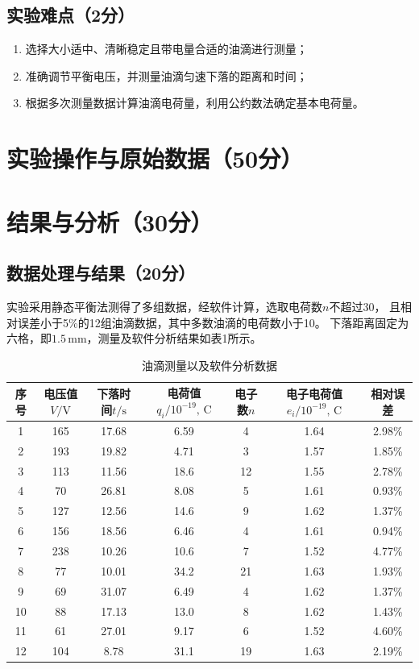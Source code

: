 \documentclass[10pt,a4paper]{ctexart} %
\begin{document}
  \subsection{实验难点（2分）}
  \begin{enumerate}
    \item 选择大小适中、清晰稳定且带电量合适的油滴进行测量；
    \item 准确调节平衡电压，并测量油滴匀速下落的距离和时间；
    \item 根据多次测量数据计算油滴电荷量，利用公约数法确定基本电荷量。
  \end{enumerate}

\section{实验操作与原始数据（50分）}

\section{结果与分析（30分）}

  \subsection{数据处理与结果（20分）}  
  实验采用静态平衡法测得了多组数据，经软件计算，选取电荷数$n$不超过30，
  且相对误差小于5\%的12组油滴数据，其中多数油滴的电荷数小于10。
  下落距离固定为六格，即$1.5\,\mathrm{mm}$，测量及软件分析结果如表1所示。
  
  \begin{table}[H]
    \centering
    \caption{油滴测量以及软件分析数据}
    \begin{tabular}{ccccccc}
      \toprule
      序号 & 电压值$V/\mathrm{V}$ & 下落时间$t/\mathrm{s}$ & 电荷值$q_i/10^{-19},\,\mathrm{C}$ 
      & 电子数$n$ & 电子电荷值$e_i/10^{-19},\,\mathrm{C}$ & 相对误差 \\
      \midrule
      1 & 165 & 17.68 & 6.59 & 4 & 1.64 & 2.98\% \\
      2 & 193 & 19.82 & 4.71 & 3 & 1.57 & 1.85\% \\
      3 & 113 & 11.56 & 18.6 & 12 & 1.55 & 2.78\% \\
      4 & 70 & 26.81 & 8.08 & 5 & 1.61 & 0.93\% \\
      5 & 127 & 12.56 & 14.6 & 9 & 1.62 & 1.37\% \\
      6 & 156 & 18.56 & 6.46 & 4 & 1.61 & 0.94\% \\
      7 & 238 & 10.26 & 10.6 & 7 & 1.52 & 4.77\% \\
      8 & 77 & 10.01 & 34.2 & 21 & 1.63 & 1.93\% \\
      9 & 69 & 31.07 & 6.49 & 4 & 1.62 & 1.37\% \\
      10 & 88 & 17.13 & 13.0 & 8 & 1.62 & 1.43\% \\
      11 & 61 & 27.01 & 9.17 & 6 & 1.52 & 4.60\% \\
      12 & 104 & 8.78 & 31.1 & 19 & 1.63 & 2.19\% \\
      \bottomrule
    \end{tabular}
  \end{table}
\end{document}
